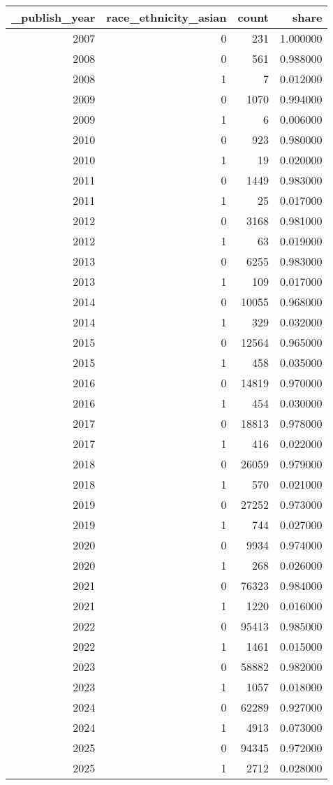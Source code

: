 \begin{tabular}{rrrr}
\toprule
_publish_year & race_ethnicity_asian & count & share \\
\midrule
2007 & 0 & 231 & 1.000000 \\
2008 & 0 & 561 & 0.988000 \\
2008 & 1 & 7 & 0.012000 \\
2009 & 0 & 1070 & 0.994000 \\
2009 & 1 & 6 & 0.006000 \\
2010 & 0 & 923 & 0.980000 \\
2010 & 1 & 19 & 0.020000 \\
2011 & 0 & 1449 & 0.983000 \\
2011 & 1 & 25 & 0.017000 \\
2012 & 0 & 3168 & 0.981000 \\
2012 & 1 & 63 & 0.019000 \\
2013 & 0 & 6255 & 0.983000 \\
2013 & 1 & 109 & 0.017000 \\
2014 & 0 & 10055 & 0.968000 \\
2014 & 1 & 329 & 0.032000 \\
2015 & 0 & 12564 & 0.965000 \\
2015 & 1 & 458 & 0.035000 \\
2016 & 0 & 14819 & 0.970000 \\
2016 & 1 & 454 & 0.030000 \\
2017 & 0 & 18813 & 0.978000 \\
2017 & 1 & 416 & 0.022000 \\
2018 & 0 & 26059 & 0.979000 \\
2018 & 1 & 570 & 0.021000 \\
2019 & 0 & 27252 & 0.973000 \\
2019 & 1 & 744 & 0.027000 \\
2020 & 0 & 9934 & 0.974000 \\
2020 & 1 & 268 & 0.026000 \\
2021 & 0 & 76323 & 0.984000 \\
2021 & 1 & 1220 & 0.016000 \\
2022 & 0 & 95413 & 0.985000 \\
2022 & 1 & 1461 & 0.015000 \\
2023 & 0 & 58882 & 0.982000 \\
2023 & 1 & 1057 & 0.018000 \\
2024 & 0 & 62289 & 0.927000 \\
2024 & 1 & 4913 & 0.073000 \\
2025 & 0 & 94345 & 0.972000 \\
2025 & 1 & 2712 & 0.028000 \\
\bottomrule
\end{tabular}
